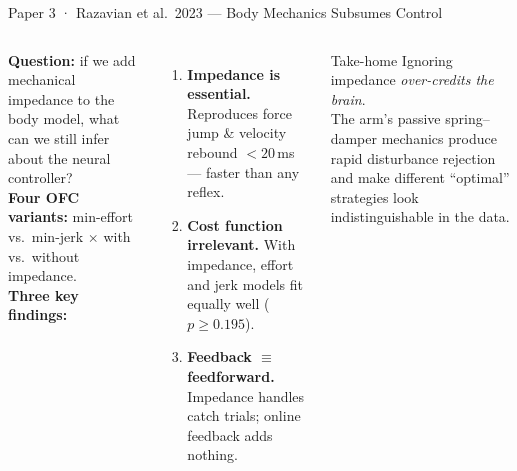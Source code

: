 \documentclass[aspectratio=169,10pt]{beamer}
\begin{document}
\begin{frame}{Paper 3 · Razavian et al.\ 2023 --- Body Mechanics Subsumes Control}
\begin{columns}[T]
  \textbf{Question:} if we add mechanical impedance to the body model, what
  can we still infer about the neural controller?\\[4pt]
  \textbf{Four OFC variants:} min-effort vs.\ min-jerk $\times$ with vs.\
  without impedance.\\[4pt]
  \textbf{Three key findings:}
  \begin{enumerate}\setlength\itemsep{2pt}
    \item \textbf{Impedance is essential.}  Reproduces force jump \&
          velocity rebound ${<}20$\,ms --- faster than any reflex.
    \item \textbf{Cost function irrelevant.}  With impedance, effort and
          jerk models fit equally well ($p \geq 0.195$).
    \item \textbf{Feedback $\equiv$ feedforward.}  Impedance handles
          catch trials; online feedback adds nothing.
  \end{enumerate}

  \begin{alertblock}{Take-home}
    Ignoring impedance \emph{over-credits the brain}.\\[4pt]
    The arm's passive spring--damper mechanics produce rapid disturbance
    rejection and make different ``optimal'' strategies look
    indistinguishable in the data.
  \end{alertblock}
\end{columns}
\end{frame}
\end{document}
